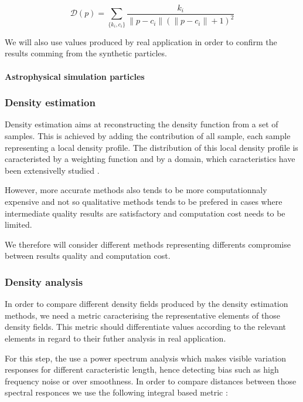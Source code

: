 \documentclass[10pt,a4paper,twoside,twocolumn]{article}
\begin{document}
\begin{equation}
	\mathcal D(p) = \sum_{\{k_i, c_i\}} \frac{k_i}{\|p-c_i\|(\|p-c_i\|+1)^2}
\end{equation}

We will also use values produced by real application in order to confirm the
results comming from the synthetic particles.

\paragraph{Astrophysical simulation particles}


\subsubsection{Density estimation}

Density estimation aims at reconstructing the density function from a set of
samples. This is achieved by adding the contribution of all sample, each sample
representing a local density profile. The distribution of this local density
profile is caracteristed by a weighting function and by a domain, which
caracteristics have been extensivelly studied
.

However, more accurate methods also tends to be more computationnaly expensive
and not so qualitative methods tends to be prefered in cases where intermediate
quality results are satisfactory and computation cost needs to be limited.

We therefore will consider different methods representing differents compromise
between results quality and computation cost.

\subsubsection{Density analysis}

In order to compare different density fields produced by the density estimation
methods, we need a metric caracterising the representative elements of those
density fields. This metric should differentiate values according to the
relevant elements in regard to their futher analysis in real application.

For this step, the use a power spectrum analysis which makes visible variation
responses for different caracteristic length, hence detecting bias such as high
frequency noise or over smoothness. In order to compare distances between those
spectral responces we use the following integral based metric :
\end{document}
